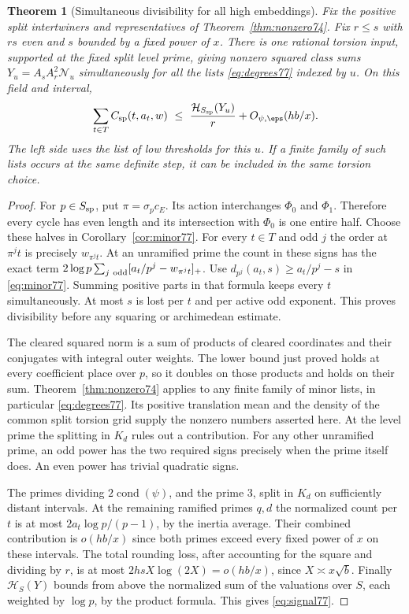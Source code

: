 \documentclass[a4paper,11pt]{article}
\newtheorem{theorem}[proposition]{Theorem}
\theoremstyle{definition}
\theoremstyle{remark}
\numberwithin{equation}{section}
\begin{document}
\begin{theorem}[Simultaneous divisibility for all high embeddings]
\label{thm:signal77}
Fix the positive split intertwiners and representatives of
Theorem~\ref{thm:nonzero74}. Fix \(r\le s\) with \(rs\) even
and \(s\) bounded by a fixed power of \(x\). There is one
rational torsion input, supported at the fixed split level prime,
giving nonzero squared class sums
\(Y_u=A_s A_r^2\mathcal N_u\) simultaneously for all the lists
\eqref{eq:degrees77} indexed by \(u\). On this field and interval,
\begin{equation}
       \sum_{t\in T} C_{\rm sp}(t,a_t,w)
       \ \le\ \frac{\mathcal H_{S_{\rm sp}}(Y_u)}{r}
                         +O_{\psi,\eps}(hb/x).
       \label{eq:signal77}
\end{equation}
The left side uses the list of low thresholds for this \(u\).
If a finite family of such lists occurs at the same definite
step, it can be included in the same torsion choice.
\end{theorem}
\begin{proof}
For \(p\in S_{\rm sp}\), put \(\pi=\sigma_p c_E\).
Its action interchanges \(\Phi_0\) and \(\Phi_1\). Therefore
every cycle has even length and its intersection with \(\Phi_0\)
is one entire half. Choose these halves in Corollary~\ref{cor:minor77}.
For every \(t\in T\) and odd \(j\) the order at \(\pi^jt\)
is precisely \(w_{\pi^jt}\). At an unramified prime the count
in these signs has the exact term
\(2\log p\sum_{j\ {\rm odd}}[a_t/p^j-w_{\pi^jt}]_+\).
Use \(d_{p^j}(a_t,s)\ge a_t/p^j-s\) in \eqref{eq:minor77}.
Summing positive parts in that formula keeps every \(t\)
simultaneously. At most \(s\) is lost per \(t\) and per active
odd exponent. This proves divisibility before any squaring
or archimedean estimate.

The cleared squared norm is a sum of products of cleared
coordinates and their conjugates with integral outer weights.
The lower bound just proved holds at every coefficient place
over \(p\), so it doubles on those products and holds on their
sum. Theorem~\ref{thm:nonzero74} applies to any finite family
of minor lists, in particular \eqref{eq:degrees77}. Its positive
translation mean and the density of the common split torsion
grid supply the nonzero numbers asserted here. At the level
prime the splitting in \(K_d\) rules out a contribution.
For any other unramified prime, an odd power has the two
required signs precisely when the prime itself does. An even
power has trivial quadratic signs.

The primes dividing \(2\operatorname{cond}(\psi)\), and the prime
3, split in \(K_d\) on sufficiently distant intervals. At the
remaining ramified primes \(q,d\) the normalized count per \(t\)
is at most \(2a_t\log p/(p-1)\), by the inertia average.
Their combined contribution is \(o(hb/x)\) since both primes
exceed every fixed power of \(x\) on these intervals. The total
rounding loss, after accounting for the square and dividing
by \(r\), is at most \(2hsX\log(2X)=o(hb/x)\), since
\(X\asymp x\sqrt b\). Finally
\(\mathcal H_S(Y)\) bounds from above the normalized sum of the
valuations over \(S\), each weighted by \(\log p\), by the
product formula. This gives \eqref{eq:signal77}.
\end{proof}
\end{document}
